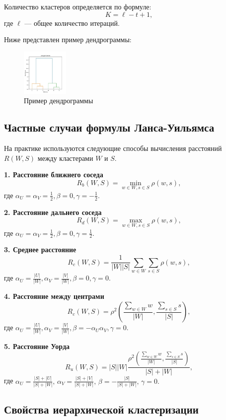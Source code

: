 Количество кластеров определяется по формуле:
\[
    K = \ell - t + 1,
\]
где \( \ell \) — общее количество итераций.

Ниже представлен пример  дендрограммы:

\begin{figure}[h!]
    \centering
    \includegraphics[width=0.2\textwidth]{chapters/clustering/images/example.jpg} %
    \caption{Пример дендрограммы}
\end{figure}


\subsection{Частные случаи формулы Ланса-Уильямса}

На практике используются следующие способы вычисления расстояний \( R(W, S) \) между кластерами \( W \) и \( S \).

\textbf{1. Расстояние ближнего соседа}
\[
    R_b(W, S) = \min_{w \in W, s \in S} \rho(w, s),
\]
где \( \alpha_U = \alpha_V = \frac{1}{2}, \beta = 0, \gamma = -\frac{1}{2} \).

\textbf{2. Расстояние дальнего соседа}
\[
    R_d(W, S) = \max_{w \in W, s \in S} \rho(w, s),
\]
где \( \alpha_U = \alpha_V = \frac{1}{2}, \beta = 0, \gamma = \frac{1}{2} \).

\textbf{3. Среднее расстояние}
\[
    R_c(W, S) = \frac{1}{|W||S|} \sum_{w \in W} \sum_{s \in S} \rho(w, s),
\]
где \( \alpha_U = \frac{|U|}{|W|}, \alpha_V = \frac{|V|}{|W|}, \beta = 0, \gamma = 0 \).

\textbf{4. Расстояние между центрами}
\[
    R_c(W, S) = \rho^2\left(\frac{\sum_{w \in W} w}{|W|}, \frac{\sum_{s \in S} s}{|S|}\right),
\]
где \( \alpha_U = \frac{|U|}{|W|}, \alpha_V = \frac{|V|}{|W|}, \beta = -\alpha_U\alpha_V, \gamma = 0 \).

\textbf{5. Расстояние Уорда}
\[
    R_u(W, S) = |S||W|\frac{\rho^2\left(\frac{\sum_{w \in W} w}{|W|}, \frac{\sum_{s \in S} s}{|S|}\right)}{|S| + |W|},
\]
где \( \alpha_U = \frac{|S| + |U|}{|S| + |W|},\,  \alpha_V =  \frac{|S| + |V|}{|S| + |W|},\,  \beta = -\frac{|S|}{|S| + |W|},\,  \gamma = 0. \)

\subsection{Свойства иерархической кластеризации}

